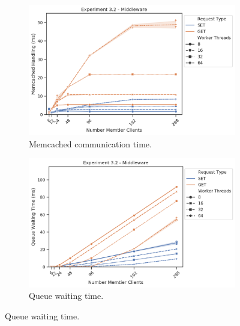 \begin{figure}
{\begin{subfigure}[t!]{0.55\textwidth}
                    \centering
                    \includegraphics[width=1\textwidth]{../data_analysis/figures/3-2_mw_mc-comm-time.png}
                    \caption{Memcached communication time.\label{fig:double_mw_mct}}
                \end{subfigure}
                \begin{subfigure}[t!]{0.55\textwidth}
                    \centering
                    \includegraphics[width=1\textwidth]{../data_analysis/figures/3-2_mw_queue-wait-time.png}
                    \caption{Queue waiting time.\label{fig:double_mw_qwt}}
                \end{subfigure}
            }
\end{figure}
